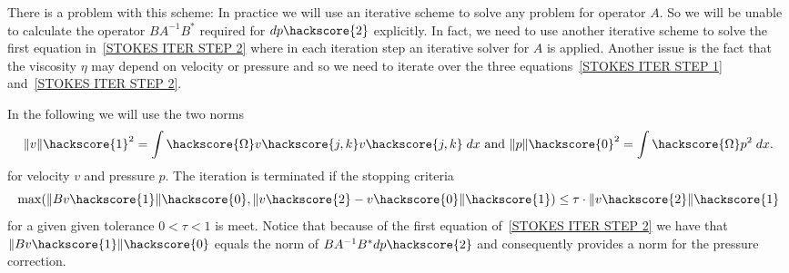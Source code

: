 There is a problem with this scheme: In practice we will use an iterative scheme
to solve any problem for operator $A$. So we will be unable to calculate the operator
$ B A^{-1} B^{*}$ required for $dp\hackscore{2}$ explicitly. In fact, we need to use another
iterative scheme to solve the first equation in~\ref{STOKES ITER STEP 2} where in each iteration step
an iterative solver for $A$ is applied. Another issue is the fact that the
viscosity $\eta$ may depend on velocity or pressure and so we need to iterate over the 
three equations~\ref{STOKES ITER STEP 1} and~\ref{STOKES ITER STEP 2}. 

In the following we will use the two norms
\begin{equation}
\|v\|\hackscore{1}^2 = \int\hackscore{\Omega} v\hackscore{j,k}v\hackscore{j,k} \; dx 
\mbox{ and }
\|p\|\hackscore{0}^2= \int\hackscore{\Omega} p^2 \; dx.
\label{STOKES STOP}
\end{equation}
for velocity $v$ and pressure $p$. The iteration is terminated if the stopping criteria
 \begin{equation} \label{STOKES STOPPING CRITERIA}
\max(\|Bv\hackscore{1}\|\hackscore{0},\|v\hackscore{2}-v\hackscore{0}\|\hackscore{1}) \le \tau \cdot \|v\hackscore{2}\|\hackscore{1} 
 \end{equation}
 for a given  given tolerance $0<\tau<1$ is meet. Notice that because of the first equation of~\ref{STOKES ITER STEP 2} we have that
$\|Bv\hackscore{1}\|\hackscore{0}$ equals the
norm of $B A^{-1} B^{*} dp\hackscore{2}$ and consequently provides a norm for the pressure correction.

